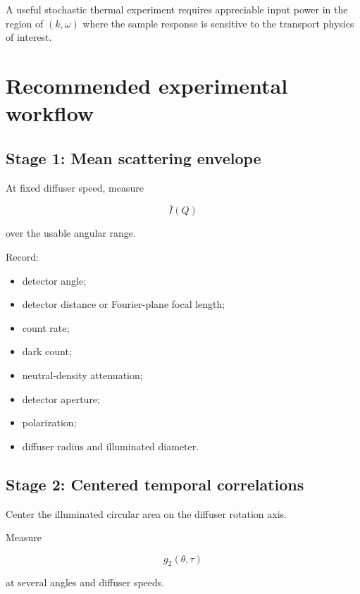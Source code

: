 \documentclass[11pt]{article}
\begin{document}
A useful stochastic thermal experiment requires appreciable input power in
the region of $(k,\omega)$ where the sample response is sensitive to the
transport physics of interest.

\section{Recommended experimental workflow}

\subsection{Stage 1: Mean scattering envelope}

At fixed diffuser speed, measure

\begin{equation}
    \overline{I}(Q)
\end{equation}

over the usable angular range.

Record:

\begin{itemize}
    \item detector angle;
    \item detector distance or Fourier-plane focal length;
    \item count rate;
    \item dark count;
    \item neutral-density attenuation;
    \item detector aperture;
    \item polarization;
    \item diffuser radius and illuminated diameter.
\end{itemize}

\subsection{Stage 2: Centered temporal correlations}

Center the illuminated circular area on the diffuser rotation axis.

Measure

\begin{equation}
    g_2(\theta,\tau)
\end{equation}

at several angles and diffuser speeds.
\end{document}
